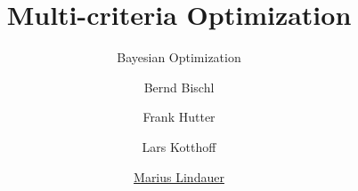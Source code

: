 


\newcommand{\a}[0]{\mathbf{a}}
\newcommand{\y}[0]{\mathbf{y}}
\newcommand{\q}[0]{\mathbf{q}}
\newcommand{\Xspace}[0]{\mathcal{X}}

\title[AutoML: Overview]{Multi-criteria Optimization}
\subtitle{Bayesian Optimization}
\author[Bernd Bischl]{Bernd Bischl \and Frank Hutter \and Lars Kotthoff \and \underline{Marius Lindauer}}
\institute{}
\date{}






	\maketitle



